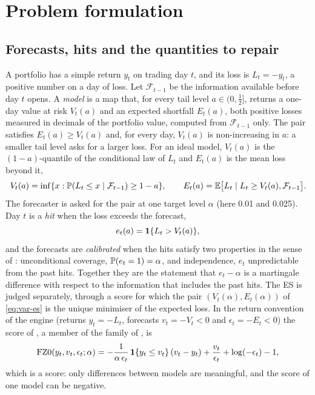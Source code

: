 \section{Problem formulation}
\label{sec:problem}

\subsection{Forecasts, hits and the quantities to repair}
\label{sec:problem-setting}

A portfolio has a simple return $y_t$ on trading day $t$, and its loss is $L_t = -y_t$, a positive number on a day of loss. Let $\mathcal{F}_{t-1}$ be the information available before day $t$ opens. A \emph{model} is a map that, for every tail level $a \in (0, \tfrac12]$, returns a one-day value at risk $V_t(a)$ and an expected shortfall $E_t(a)$, both positive losses measured in decimals of the portfolio value, computed from $\mathcal{F}_{t-1}$ only. The pair satisfies $E_t(a) \ge V_t(a)$ and, for every day, $V_t(a)$ is non-increasing in $a$: a smaller tail level asks for a larger loss. For an ideal model, $V_t(a)$ is the $(1-a)$-quantile of the conditional law of $L_t$ and $E_t(a)$ is the mean loss beyond it,
\begin{equation}
V_t(a) = \inf\{x : \mathbb{P}(L_t \le x \mid \mathcal{F}_{t-1}) \ge 1-a\}, \qquad E_t(a) = \mathbb{E}\bigl[L_t \mid L_t \ge V_t(a), \mathcal{F}_{t-1}\bigr].
\label{eq:var-es}
\end{equation}
The forecaster is asked for the pair at one target level $\alpha$ (here 0.01 and 0.025). Day $t$ is a \emph{hit} when the loss exceeds the forecast,
\begin{equation}
e_t(a) = \mathbf{1}\{L_t > V_t(a)\},
\label{eq:hit}
\end{equation}
and the forecasts are \emph{calibrated} when the hits satisfy two properties in the sense of \citet{christoffersen1998}: unconditional coverage, $\mathbb{P}(e_t = 1) = \alpha$, and independence, $e_t$ unpredictable from the past hits. Together they are the statement that $e_t - \alpha$ is a martingale difference with respect to the information that includes the past hits. The ES is judged separately, through a score for which the pair $(V_t(\alpha), E_t(\alpha))$ of \cref{eq:var-es} is the unique minimiser of the expected loss. In the return convention of the engine (returns $y_t = -L_t$, forecasts $v_t = -V_t < 0$ and $\epsilon_t = -E_t < 0$) the score of \citet{pattonziegelchen2019}, a member of the family of \citet{fissler2016}, is
\begin{equation}
\mathrm{FZ0}(y_t, v_t, \epsilon_t; \alpha) = -\frac{1}{\alpha\,\epsilon_t}\,\mathbf{1}\{y_t \le v_t\}\,(v_t - y_t) + \frac{v_t}{\epsilon_t} + \log(-\epsilon_t) - 1,
\label{eq:fz0}
\end{equation}
which is a score: only differences between models are meaningful, and the score of one model can be negative.

